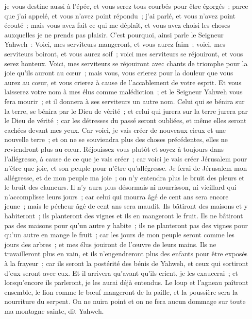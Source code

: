 \begin{multicols}{2}
je vous destine aussi à l'épée, et vous serez tous courbés pour être égorgés~; parce que j'ai appelé, et vous n'avez point répondu~; j'ai parlé, et vous n'avez point écouté~; mais vous avez fait ce qui me déplaît, et vous avez choisi les choses auxquelles je ne prends pas plaisir.
C'est pourquoi, ainsi parle le Seigneur Yahweh~: Voici, mes serviteurs mangeront, et vous aurez faim~; voici, mes serviteurs boiront, et vous aurez soif~; voici mes serviteurs se réjouiront, et vous serez honteux.
Voici, mes serviteurs se réjouiront avec chants de triomphe pour la joie qu'ils auront au cœur~; mais vous, vous crierez pour la douleur que vous aurez au cœur, et vous crierez à cause de l'accablement de votre esprit.
Et vous laisserez votre nom à mes élus comme malédiction~; et le Seigneur Yahweh vous fera mourir~; et il donnera à ses serviteurs un autre nom.
Celui qui se bénira sur la terre, se bénira par le Dieu de vérité~; et celui qui jurera sur la terre jurera par le Dieu de vérité~; car les détresses du passé seront oubliées, et même elles seront cachées devant mes yeux.
Car voici, je vais créer de nouveaux cieux et une nouvelle terre~; et on ne se souviendra plus des choses précédentes, elles ne reviendront plus au cœur.
Réjouissez-vous plutôt et soyez à toujours dans l'allégresse, à cause de ce que je vais créer~; car voici je vais créer Jérusalem pour n'être que joie, et son peuple pour n'être qu'allégresse.
Je ferai de Jérusalem mon allégresse, et de mon peuple ma joie~; on n'y entendra plus le bruit des pleurs et le bruit des clameurs.
Il n'y aura plus désormais ni nourrisson, ni vieillard qui n'accomplisse leurs jours~; car celui qui mourra âgé de cent ans sera encore jeune~; mais le pécheur âgé de cent ans sera maudit.
Ils bâtiront des maisons et y habiteront~; ils planteront des vignes et ils en mangeront le fruit.
Ils ne bâtiront pas des maisons pour qu'un autre y habite~; ils ne planteront pas des vignes pour qu'un autre en mange le fruit~; car les jours de mon peuple seront comme les jours des arbres~; et mes élus jouiront de l'œuvre de leurs mains.
Ils ne travailleront plus en vain, et ils n'engendreront plus des enfants pour être exposés à la frayeur~; car ils seront la postérité des bénis de Yahweh, et ceux qui sortiront d'eux seront avec eux.
Et il arrivera qu'avant qu'ils crient, je les exaucerai~; et lorsqu'encore ils parleront, je les aurai déjà entendus.
Le loup et l'agneau paîtront ensemble, le lion comme le bœuf mangeront de la paille, et la poussière sera la nourriture du serpent. On ne nuira point et on ne fera aucun dommage sur toute ma montagne sainte, dit Yahweh.

\end{multicols}
